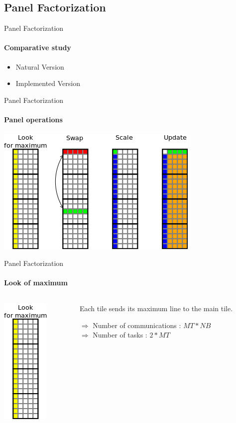 \documentclass{beamer}
\begin{document}
\subsection{Panel Factorization}

\begin{frame}{Panel Factorization}
\framesubtitle{Comparative study}
\begin{itemize}
\item Natural Version
\item Implemented Version
\end{itemize}
\end{frame}

\begin{frame}{Panel Factorization}
\framesubtitle{Panel operations}
\begin{center}
\includegraphics[scale=0.8]{panel_operation.png}
\end{center}
\end{frame}

\begin{frame}{Panel Factorization}
\framesubtitle{Look of maximum}
\begin{columns}
\begin{column}{.30\textwidth}
\begin{center}
\includegraphics[scale=0.8]{panel_max.png}
\end{center}
\end{column}
\hfill
\begin{column}{.70\textwidth}
Each tile sends its maximum line to the main tile.
\begin{center}
\begin{exampleblock}{}
$\Longrightarrow$ Number of communications : $MT*NB$\\
$\Longrightarrow$ Number of tasks : $2*MT$
\end{exampleblock}{}
\end{center}
\end{column}
\end{columns}
\end{frame}
\end{document}
